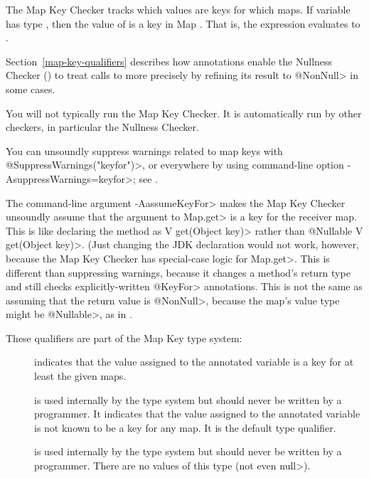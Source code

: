 \htmlhr
{}

The Map Key Checker tracks which values are keys for which maps.  If variable
 has type , then the value of  is a key
in Map .  That is, the expression  evaluates to
.

Section~\ref{map-key-qualifiers} describes how  annotations
enable the
Nullness Checker () to treat calls to
more precisely by refining its result to \<@NonNull> in some cases.



You will not typically run the Map Key Checker.  It is automatically run by
other checkers, in particular the Nullness Checker.

You can unsoundly suppress warnings related to map keys with
\<@SuppressWarnings("keyfor")>, or everywhere by using command-line option
\<-AsuppressWarnings=keyfor>; see .

The command-line argument \<-AassumeKeyFor> makes the Map Key Checker
unsoundly assume that the argument to \<Map.get> is a key for the receiver
map.  This is like declaring the method as \<V get(Object key)> rather than
\<@Nullable V get(Object key)>.  (Just changing the JDK declaration would not
work, however, because the Map Key Checker has special-case logic for
\<Map.get>.  This is different than suppressing warnings, because it
changes a method's return type and still checks explicitly-written
\<@KeyFor> annotations.  This is not the same as assuming that the
return value is \<@NonNull>, because the map's value type might be
\<@Nullable>, as in .



These qualifiers are part of the Map Key type system:

\begin{description}

\item[]
  indicates that the value assigned to the annotated variable is a key for at
  least the given maps.

\item[]
  is used internally by the type system but should never be written by a
  programmer.  It indicates that the value assigned to the annotated
  variable is not known to be a key for any map.  It is the default type
  qualifier.

\item[]
  is used internally by the type system but should never be written by a
  programmer.  There are no values of this type (not even \<null>).

\end{description}

